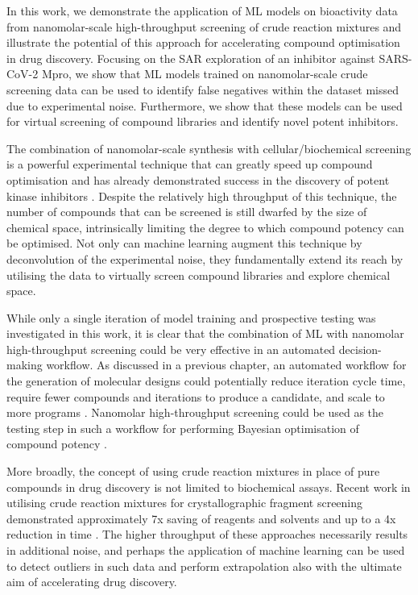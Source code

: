 In this work, we demonstrate the application of ML models on bioactivity data from nanomolar-scale high-throughput screening of crude reaction mixtures and illustrate the potential of this approach for accelerating compound optimisation in drug discovery. Focusing on the SAR exploration of an inhibitor against SARS-CoV-2 Mpro, we show that ML models trained on nanomolar-scale crude screening data can be used to identify false negatives within the dataset missed due to experimental noise. Furthermore, we show that these models can be used for virtual screening of compound libraries and identify novel potent inhibitors.

The combination of nanomolar-scale synthesis with cellular/biochemical screening is a powerful experimental technique that can greatly speed up compound optimisation and has already demonstrated success in the discovery of potent kinase inhibitors \cite{Gesmundo2018nanosar, Gehrtz2022nanomolar}. Despite the relatively high throughput of this technique, the number of compounds that can be screened is still dwarfed by the size of chemical space, intrinsically limiting the degree to which compound potency can be optimised. Not only can machine learning augment this technique by deconvolution of the experimental noise, they fundamentally extend its reach by utilising the data to virtually screen compound libraries and explore chemical space.

While only a single iteration of model training and prospective testing was investigated in this work, it is clear that the combination of ML with nanomolar high-throughput screening could be very effective in an automated decision-making workflow. As discussed in a previous chapter, an automated workflow for the generation of molecular designs could potentially reduce iteration cycle time, require fewer compounds and iterations to produce a candidate, and scale to more programs \cite{Schneider2018AutomatingDrugDiscovery, Coley2020Outlook, Goldman2022ChemicalDesignLevels}. Nanomolar high-throughput screening could be used as the testing step in such a workflow for performing Bayesian optimisation of compound potency \cite{korovina2019chembo}.

More broadly, the concept of using crude reaction mixtures in place of pure compounds in drug discovery is not limited to biochemical assays. Recent work in utilising crude reaction mixtures for crystallographic fragment screening demonstrated approximately 7x saving of reagents and solvents and up to a 4x reduction in time \cite{Baker2020FragementsFromCrude}. The higher throughput of these approaches necessarily results in additional noise, and perhaps the application of machine learning can be used to detect outliers in such data and perform extrapolation also with the ultimate aim of accelerating drug discovery.

